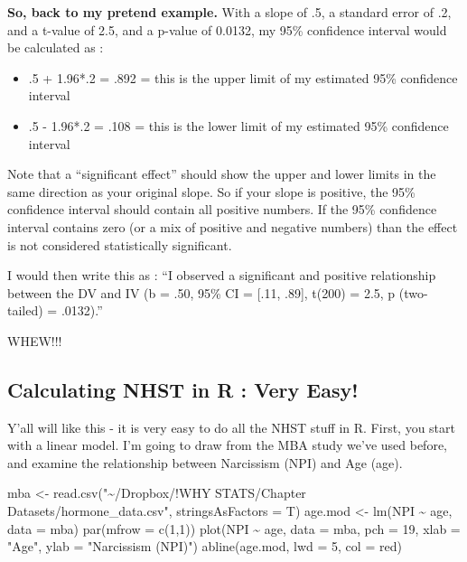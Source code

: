\documentclass[
  letterpaper,
  DIV=11,
  numbers=noendperiod,
  oneside]{scrreprt}
\newenvironment{Shaded}{\begin{snugshade}}{\end{snugshade}}
\newcommand{\AttributeTok}[1]{\textcolor[rgb]{0.40,0.45,0.13}{#1}}
\newcommand{\DecValTok}[1]{\textcolor[rgb]{0.68,0.00,0.00}{#1}}
\newcommand{\FunctionTok}[1]{\textcolor[rgb]{0.28,0.35,0.67}{#1}}
\newcommand{\NormalTok}[1]{\textcolor[rgb]{0.00,0.23,0.31}{#1}}
\newcommand{\OtherTok}[1]{\textcolor[rgb]{0.00,0.23,0.31}{#1}}
\newcommand{\SpecialCharTok}[1]{\textcolor[rgb]{0.37,0.37,0.37}{#1}}
\newcommand{\StringTok}[1]{\textcolor[rgb]{0.13,0.47,0.30}{#1}}
\begin{document}
\textbf{So, back to my pretend example.} With a slope of .5, a standard
error of .2, and a t-value of 2.5, and a p-value of 0.0132, my 95\%
confidence interval would be calculated as :~

\begin{itemize}
\item
  .5 + 1.96*.2 = .892 = this is the upper limit of my estimated 95\%
  confidence interval
\item
  .5 - 1.96*.2 = .108 = this is the lower limit of my estimated 95\%
  confidence interval
\end{itemize}

Note that a ``significant effect'' should show the upper and lower
limits in the same direction as your original slope. So if your slope is
positive, the 95\% confidence interval should contain all positive
numbers. If the 95\% confidence interval contains zero (or a mix of
positive and negative numbers) than the effect is not considered
statistically significant.

I would then write this as : ``I observed a significant and positive
relationship between the DV and IV (b = .50, 95\% CI = {[}.11, .89{]},
t(200) = 2.5, p (two-tailed) = .0132).''~

WHEW!!!

\subsection{Calculating NHST in R : Very
Easy!}\label{calculating-nhst-in-r-very-easy}

Y'all will like this - it is very easy to do all the NHST stuff in R.
First, you start with a linear model. I'm going to draw from the MBA
study we've used before, and examine the relationship between Narcissism
(NPI) and Age (age).

\begin{Shaded}
\begin{Highlighting}[]
\NormalTok{mba }\OtherTok{\textless{}{-}} \FunctionTok{read.csv}\NormalTok{(}\StringTok{"\textasciitilde{}/Dropbox/!WHY STATS/Chapter Datasets/hormone\_data.csv"}\NormalTok{, }\AttributeTok{stringsAsFactors =}\NormalTok{ T)}
\NormalTok{age.mod }\OtherTok{\textless{}{-}} \FunctionTok{lm}\NormalTok{(NPI }\SpecialCharTok{\textasciitilde{}}\NormalTok{ age, }\AttributeTok{data =}\NormalTok{ mba)}
\FunctionTok{par}\NormalTok{(}\AttributeTok{mfrow =} \FunctionTok{c}\NormalTok{(}\DecValTok{1}\NormalTok{,}\DecValTok{1}\NormalTok{))}
\FunctionTok{plot}\NormalTok{(NPI }\SpecialCharTok{\textasciitilde{}}\NormalTok{ age, }\AttributeTok{data =}\NormalTok{ mba, }\AttributeTok{pch =} \DecValTok{19}\NormalTok{, }\AttributeTok{xlab =} \StringTok{"Age"}\NormalTok{, }\AttributeTok{ylab =} \StringTok{"Narcissism (NPI)"}\NormalTok{)}
\FunctionTok{abline}\NormalTok{(age.mod, }\AttributeTok{lwd =} \DecValTok{5}\NormalTok{, }\AttributeTok{col =} \StringTok{\textquotesingle{}red\textquotesingle{}}\NormalTok{)}
\end{Highlighting}
\end{Shaded}
\end{document}

